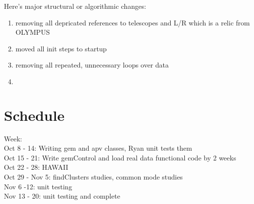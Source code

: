 \documentclass[11pt]{article}
\begin{document}
Here's major structural or algorithmic changes:

	\begin{enumerate}
		\item 
			removing all depricated references to telescopes and L/R which is a relic from OLYMPUS
		\item 
			moved all init steps to startup
		\item
			removing all repeated, unnecessary loops over data
		\item 
			
	\end{enumerate}


\section{Schedule}

Week:\\
Oct 8 - 14: Writing gem and apv classes, Ryan unit tests them\\
Oct 15 - 21: Write gemControl and load real data functional code by 2 weeks\\
Oct 22 - 28: HAWAII\\
Oct 29 - Nov 5: findClusters studies, common mode studies \\
Nov 6 -12: unit testing\\
Nov 13 - 20: unit testing and complete\\
\end{document}
